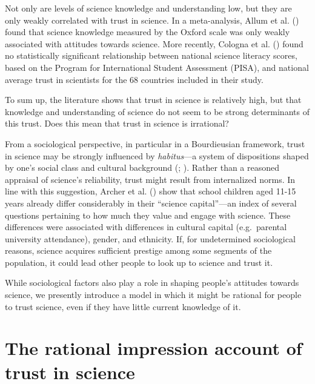 \documentclass[
  jou,
  floatsintext,
  longtable,
  nolmodern,
  notxfonts,
  notimes,
  colorlinks=true,linkcolor=blue,citecolor=blue,urlcolor=blue]{apa7}
\begin{document}
Not only are levels of science knowledge and understanding low, but they
are only weakly correlated with trust in science. In a meta-analysis,
Allum et al. ()
found that science knowledge measured by the Oxford scale was only
weakly associated with attitudes towards science. More recently, Cologna
et al. () found no
statistically significant relationship between national science literacy
scores, based on the Program for International Student Assessment
(PISA), and national average trust in scientists for the 68 countries
included in their study.

To sum up, the literature shows that trust in science is relatively
high, but that knowledge and understanding of science do not seem to be
strong determinants of this trust. Does this mean that trust in science
is irrational?

From a sociological perspective, in particular in a Bourdieusian
framework, trust in science may be strongly influenced by
\emph{habitus}---a system of dispositions shaped by one's social class
and cultural background
(; ). Rather than a reasoned appraisal of science's reliability, trust
might result from internalized norms. In line with this suggestion,
Archer et al. ()
show that school children aged 11-15 years already differ considerably
in their ``science capital''---an index of several questions pertaining
to how much they value and engage with science. These differences were
associated with differences in cultural capital (e.g.~parental
university attendance), gender, and ethnicity. If, for undetermined
sociological reasons, science acquires sufficient prestige among some
segments of the population, it could lead other people to look up to
science and trust it.

While sociological factors also play a role in shaping people's
attitudes towards science, we presently introduce a model in which it
might be rational for people to trust science, even if they have little
current knowledge of it.

\section{The rational impression account of trust in
science}\label{the-rational-impression-account-of-trust-in-science}
\end{document}
